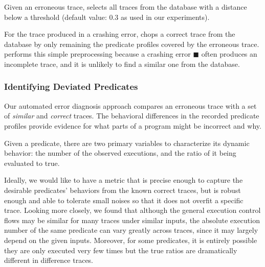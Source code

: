 Given an erroneous trace, \ourtool selects all traces from the database
with a distance below a threshold (default value: 0.3 as used in our
experiments).

For the trace produced in a crashing error, \ourtool 
chops a correct trace from the database by only remaining the predicate
profiles covered by the erroneous trace. \ourtool performs
this simple preprocessing because a crashing error $\blacksquare$
often produces an incomplete trace, and it is unlikely
to find a similar one from the database.


\subsubsection{Identifying Deviated Predicates}
\label{sec:deviation}


Our
automated error diagnosis approach compares an erroneous trace with a set
of \textit{similar} and \textit{correct} traces. 
The behavioral differences in the recorded predicate profiles provide evidence for what parts of a program might be
incorrect and why. %

Given a predicate, there are two primary variables to
characterize its dynamic behavior: the number of the
observed executions, and the ratio of it being evaluated to true.


Ideally, we would like to have a metric that
is precise enough to capture the desirable predicates' behaviors
from the known correct traces, but is robust enough and
able to tolerate small noises so that it does
not overfit a specific trace.
Looking more closely, we found that although
the general execution control flows may be similar for many 
traces under similar inputs, the absolute execution number of the same predicate
can vary greatly across traces, since it may
largely depend on the given inputs. Moreover, for
some predicates, it is entirely possible they are
only executed very few times but the true ratios
are dramatically different in difference traces.




